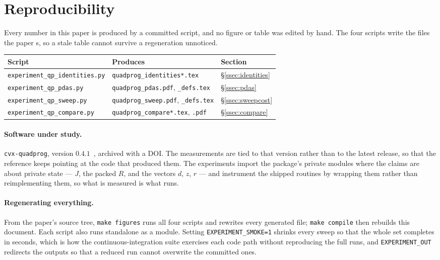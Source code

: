 \section*{Reproducibility}
\label{sec:reproducibility}

Every number in this paper is produced by a committed script, and no figure or
table was edited by hand. The four scripts write the files the paper
\verb||s, so a stale table cannot survive a regeneration unnoticed.

\begin{center}
\small
\begin{tabular}{lll}
\toprule
Script & Produces & Section \\
\midrule
\verb|experiment_qp_identities.py| & \verb|quadprog_identities*.tex|
  & \S\ref{ssec:identities} \\
\verb|experiment_qp_pdas.py| & \verb|quadprog_pdas.pdf|, \verb|_defs.tex|
  & \S\ref{ssec:pdas} \\
\verb|experiment_qp_sweep.py| & \verb|quadprog_sweep.pdf|, \verb|_defs.tex|
  & \S\ref{ssec:sweepcost} \\
\verb|experiment_qp_compare.py| & \verb|quadprog_compare*.tex|, \verb|.pdf|
  & \S\ref{ssec:compare} \\
\bottomrule
\end{tabular}
\end{center}

\paragraph{Software under study.} \texttt{cvx-quadprog}, version
$0.4.1$~\cite{cvxquadprog}, archived with a DOI. The measurements are tied to that
version rather than to the latest release, so that the reference keeps pointing at
the code that produced them. The experiments import the package's private modules
where the claims are about private state --- $J$, the packed $R$, and the vectors
$d$, $z$, $r$ --- and instrument the shipped routines by wrapping them rather than
reimplementing them, so what is measured is what runs.

\paragraph{Regenerating everything.} From the paper's source tree, \verb|make figures|
runs all four scripts and rewrites every generated file; \verb|make compile| then
rebuilds this document. Each script also runs standalone as a module. Setting
\verb|EXPERIMENT_SMOKE=1| shrinks every sweep so that the whole set completes in
seconds, which is how the continuous-integration suite exercises each code path
without reproducing the full runs, and \verb|EXPERIMENT_OUT| redirects the outputs
so that a reduced run cannot overwrite the committed ones.


